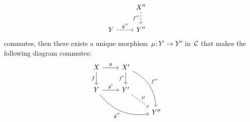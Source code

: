 \begin{definition*}
\begin{enumerate}
\begin{enumerate}[label=(PO\arabic*)]
\[\begin{tikzcd}
              & X''
                \arrow[dashed]{d}[left]{f''}
              \\
                Y
                \arrow[dashed]{r}[above]{g''}
              & Y''
            \end{tikzcd}
          \]
          commutes, then there exists a unique morphism~$\mu \colon Y' \to Y''$ in~$\mathcal{C}$ that makes the following diagram commutes:
          \[
            \begin{tikzcd}
                X
                \arrow{r}[above]{g}
                \arrow{d}[left]{f}
              & X'
                \arrow[bend left]{ddr}[above right]{f''}
                \arrow{d}[left]{f'}
              & {}
              \\
                Y
                \arrow{r}[above]{g'}
                \arrow[bend right]{drr}[below left]{g''}
              & Y'
                \arrow[dashed]{dr}[above right]{\mu}
              & {}
              \\
                {}
              & {}
              & Y''
            \end{tikzcd}
          \]
      \end{enumerate}
  \end{enumerate}
\end{definition*}


